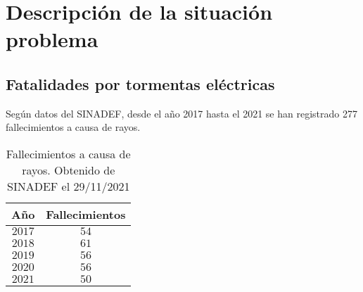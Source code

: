 \section{Descripción de la situación problema}

\subsection{Fatalidades por tormentas eléctricas}

Según datos del SINADEF, desde el año 2017 hasta el 2021 se han registrado 277 
fallecimientos a causa de rayos.

\begin{table}[h]
  \centering
  \label{tab:fallecimientos_rayo}
  \caption[Fallecimientos a causa de rayos 2017-2021]{
    Fallecimientos a causa de rayos. Obtenido de SINADEF el 29/11/2021
    }
  \begin{tabular}{c|c}
    Año & Fallecimientos\\
    \hline
    $2017$ & $54$\\
    $2018$ & $61$\\
    $2019$ & $56$\\
    $2020$ & $56$\\
    $2021$ & $50$\\
    \end{tabular}
\end{table}


